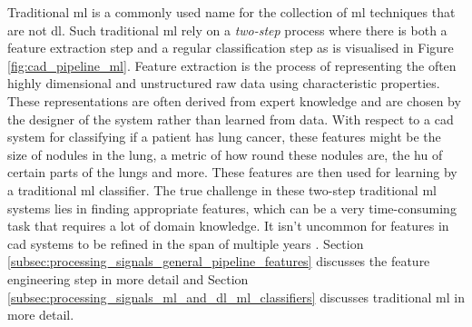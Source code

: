 Traditional \gls{ml} is a commonly used name for the collection of \gls{ml} techniques that are not \gls{dl}.
Such traditional \gls{ml} rely on a \textit{two-step} process where there is both a feature extraction step and a regular classification step as is visualised in Figure \ref{fig:cad_pipeline_ml}.
Feature extraction is the process of representing the often highly dimensional and unstructured raw data using characteristic properties.
These representations are often derived from expert knowledge and are chosen by the designer of the system rather than learned from data.
With respect to a \gls{cad} system for classifying if a patient has lung cancer, these features might be the size of nodules in the lung, a metric of how round these nodules are, the \gls{hu} of certain parts of the lungs and more.
These features are then used for learning by a traditional \gls{ml} classifier.
The true challenge in these two-step traditional \gls{ml} systems lies in finding appropriate features, which can be a very time-consuming task that requires a lot of domain knowledge.
It isn't uncommon for features in \gls{cad} systems to be refined in the span of multiple years \citep{CAD_ml_dl_kbs}.
Section \ref{subsec:processing_signals_general_pipeline_features} discusses the feature engineering step in more detail and Section \ref{subsec:processing_signals_ml_and_dl_ml_classifiers} discusses traditional \gls{ml} in more detail.

